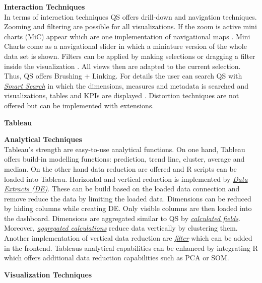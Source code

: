 \textbf{Interaction Techniques}\\
In terms of interaction techniques QS offers drill-down and navigation techniques. Zooming and filtering are possible for all visualizations. If the zoom is active mini charts  (MiC) appear which are one implementation of navigational maps  \cite{Beard1989}. Mini Charts come as a navigational slider in which a miniature version of the whole data set  \cite{Beard1989} is shown. 
Filters can be applied by making selections or dragging a filter inside the visualization  \cite{qlikSheet}. All views then are adapted to the current selection. Thus, QS offers Brushing + Linking. For details the user can search QS with \href{https://help.qlik.com/en-US/sense/2.1/Content/Videos/Videos-global-smart-search.htm}{\textit{Smart Search}} in which the dimensions, measures and metadata is searched and visualizations, tables and KPIs are displayed  \cite{qlikSmart}. Distortion techniques are not offered but can be implemented with extensions. 
\par
\noindent \textbf{Tableau}
\par
\textbf{Analytical Techniques}\\
Tableau's strength are easy-to-use analytical functions. On one hand, Tableau offers build-in modelling functions: prediction, trend line, cluster, average and median. On the other hand data reduction are offered and R scripts can be loaded into Tableau. Horizontal and vertical reduction is implemented by \href{http://onlinehelp.tableau.com/current/pro/desktop/en-us/extracting_data.html}{\textit{Data Extracts  (DE)}}. These can be build based on the loaded data connection and remove reduce the data by limiting the loaded data. Dimensions can be reduced by hiding columns while creating DE. Only visible columns are then loaded into the dashboard. Dimensions are aggregated similar to QS by \href{http://onlinehelp.tableau.com/current/pro/desktop/en-us/calculations_calculatedfields.html}{\textit{calculated fields}}. Moreover,  \href{http://onlinehelp.tableau.com/current/pro/desktop/en-us/calculations_calculatedfields_aggregate.html}{\textit{aggregated calculations}} reduce data vertically by clustering them. Another implementation of vertical data reduction are  \href{http://kb.tableau.com/articles/howto/adding-filters-to-dashboards}{\textit{filter}} which can be added in the frontend. Tableaus analytical capabilities can be enhanced by integrating R which offers additional data reduction capabilities such as PCA or SOM.
\par
\textbf{Visualization Techniques}\\

